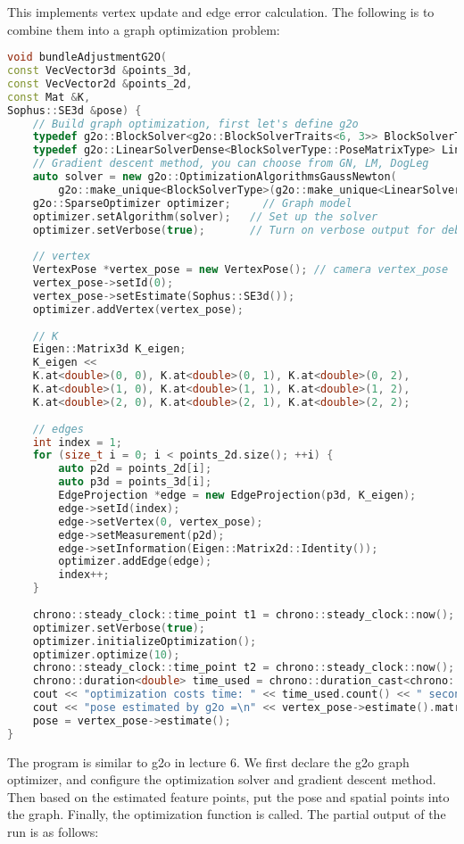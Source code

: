 This implements vertex update and edge error calculation. The following is to combine them into a graph optimization problem:
\begin{lstlisting}[language=c++,caption=slambook2/ch7/pose_estimation_3d2d.cpp（片段）]
void bundleAdjustmentG2O(
const VecVector3d &points_3d,
const VecVector2d &points_2d,
const Mat &K,
Sophus::SE3d &pose) {
	// Build graph optimization, first let's define g2o
	typedef g2o::BlockSolver<g2o::BlockSolverTraits<6, 3>> BlockSolverType;  // pose is 6, landmark is 3
	typedef g2o::LinearSolverDense<BlockSolverType::PoseMatrixType> LinearSolverType;
	// Gradient descent method, you can choose from GN, LM, DogLeg
	auto solver = new g2o::OptimizationAlgorithmsGaussNewton(
		g2o::make_unique<BlockSolverType>(g2o::make_unique<LinearSolverType>()));
	g2o::SparseOptimizer optimizer;     // Graph model
	optimizer.setAlgorithm(solver);   // Set up the solver
	optimizer.setVerbose(true);       // Turn on verbose output for debugging
	
	// vertex
	VertexPose *vertex_pose = new VertexPose(); // camera vertex_pose
	vertex_pose->setId(0);
	vertex_pose->setEstimate(Sophus::SE3d());
	optimizer.addVertex(vertex_pose);
	
	// K
	Eigen::Matrix3d K_eigen;
	K_eigen <<
	K.at<double>(0, 0), K.at<double>(0, 1), K.at<double>(0, 2),
	K.at<double>(1, 0), K.at<double>(1, 1), K.at<double>(1, 2),
	K.at<double>(2, 0), K.at<double>(2, 1), K.at<double>(2, 2);
	
	// edges
	int index = 1;
	for (size_t i = 0; i < points_2d.size(); ++i) {
		auto p2d = points_2d[i];
		auto p3d = points_3d[i];
		EdgeProjection *edge = new EdgeProjection(p3d, K_eigen);
		edge->setId(index);
		edge->setVertex(0, vertex_pose);
		edge->setMeasurement(p2d);
		edge->setInformation(Eigen::Matrix2d::Identity());
		optimizer.addEdge(edge);
		index++;
	}
	
	chrono::steady_clock::time_point t1 = chrono::steady_clock::now();
	optimizer.setVerbose(true);
	optimizer.initializeOptimization();
	optimizer.optimize(10);
	chrono::steady_clock::time_point t2 = chrono::steady_clock::now();
	chrono::duration<double> time_used = chrono::duration_cast<chrono::duration<double>>(t2 - t1);
	cout << "optimization costs time: " << time_used.count() << " seconds." << endl;
	cout << "pose estimated by g2o =\n" << vertex_pose->estimate().matrix() << endl;
	pose = vertex_pose->estimate();
}
\end{lstlisting}

The program is similar to g2o in lecture 6. We first declare the g2o graph optimizer, and configure the optimization solver and gradient descent method. Then based on the estimated feature points, put the pose and spatial points into the graph. Finally, the optimization function is called. The partial output of the run is as follows:

